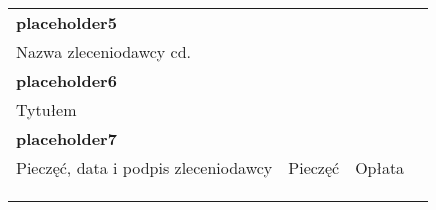\documentclass{article}
\begin{document}
\begin{table}[t]
{\begin{tabularx}{\textwidth}{|Xccll|c|}
\multicolumn{5}{|l|}{\textbf{placeholder5}}                                                       &                                             \\
\multicolumn{5}{|l|}{Nazwa zleceniodawcy cd.}                                                                           &                                             \\
\multicolumn{5}{|l|}{\textbf{placeholder6}}                                                             &                                             \\
\multicolumn{5}{|l|}{Tytułem}                                                                                           &                                             \\
\multicolumn{5}{|l|}{\textbf{placeholder7}}                                                                                               &                                             \\ \cline{1-5}
\multicolumn{3}{|l|}{Pieczęć, data i podpis zleceniodawcy} & \multicolumn{1}{l|}{Pieczęć}           & Opłata  \hspace{20px}          &                                             \\ \cline{1-5}
\multicolumn{3}{|l|}{\multirow{3}{*}{}}                    & \multicolumn{1}{l|}{\multirow{3}{*}{}} & \multirow{3}{*}{} &                                             \\
\multicolumn{3}{|l|}{}                                     & \multicolumn{1}{l|}{}                  &                   &                                             \\
\multicolumn{3}{|l|}{}                                     & \multicolumn{1}{l|}{}                               &                   &                                             \\ \hline
\end{tabularx}
}
\end{table}
\end{document}

